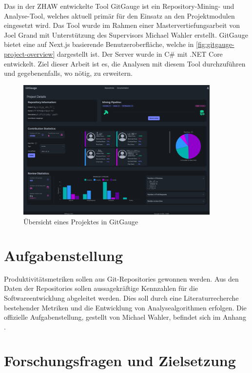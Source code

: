 Das in der ZHAW entwickelte Tool GitGauge ist ein Repository-Mining- und Analy\-se-Tool, welches aktuell primär für den Einsatz an den Projektmodulen eingesetzt wird. Das Tool wurde im Rahmen einer Mastervertiefungsarbeit von Joel Grand mit Unterstützung des Supervisors Michael Wahler erstellt. GitGauge bietet eine auf Next.js basierende Benutzeroberfläche, welche in \autoref{fig:gitgauge-project-overview} dargestellt ist. Der Server wurde in C\# mit .NET Core entwickelt. Ziel dieser Arbeit ist es, die Analysen mit diesem Tool durchzuführen und gegebenenfalls, wo nötig, zu erweitern. \parencite{grand_joel_wahler_michael_waspe_lara_stumpf_simon_repo_nodate}

\begin{figure}[htbp]
    \centering
    \includegraphics[width=0.9\textwidth]{Figures/giggauge-overview.png}
    \caption{Übersicht eines Projektes in GitGauge}
    \label{fig:gitgauge-project-overview}
\end{figure}

\newpage

\section{Aufgabenstellung}
Produktivitätsmetriken sollen aus Git-Repositories gewonnen werden. Aus den Daten der Repositories sollen aussagekräftige Kennzahlen für die Softwareentwicklung abgeleitet werden. Dies soll durch eine Literaturrecherche bestehender Metriken und die Entwicklung von Analysealgorithmen erfolgen.
Die offizielle Aufgabenstellung, gestellt von Michael Wahler, befindet sich im Anhang .
\newpage
\section{Forschungsfragen und Zielsetzung}
\label{sec:Zielsetzung}

